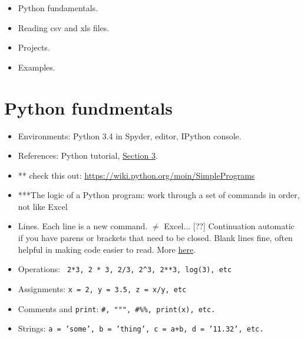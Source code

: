 \documentclass[11pt]{article}
\begin{document}
\begin{itemize}
\item Python fundamentals.
\item Reading csv and xls files.
\item Projects.
\item Examples.
\end{itemize}

\section{Python fundmentals}

\begin{itemize}
\item Environments:  Python 3.4 in Spyder, editor, IPython console.
\item References:
 {Python tutorial},
\href{https://docs.python.org/3.4/tutorial/introduction.html}{Section 3}.

\item ** check this out:  \url{https://wiki.python.org/moin/SimplePrograms} \\


\item ***The logic of a Python program:
work through a set of commands in order, not like Excel

\item Lines.  Each line is a new command.  $\neq$ Excel...  [??]
Continuation automatic if you have parens or brackets that need to be closed.
Blank lines fine, often helpful in making code easier to read.
More
\href{https://docs.python.org/3.4/reference/lexical_analysis.html#line-structure}{here}.

\item Operations:  \verb: 2*3, 2 * 3, 2/3, 2^3, 2**3, log(3), etc :

\item Assignments:  {\tt x = 2, y = 3.5, z = x/y, etc }
\item Comments and {\tt print}:  \verb:#, """, #%%, print(x), etc. :



\item Strings:  {\tt a = 'some', b = 'thing', c = a+b, d = '11.32', etc.}


\end{itemize}
\end{document}

